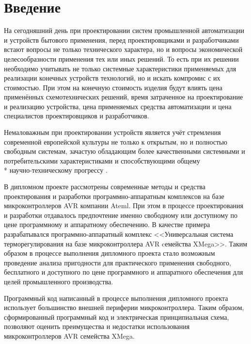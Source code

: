 \section*{Введение}
\begin{par}
На сегодняшний день при проектировании систем промышленной автоматизации и устройств
бытового применения, перед проектировщиками и разработчиками встают вопросы не только технического
характера, но и вопросы экономической целесообразности применения тех или иных решений.
То есть при их решении необходимо учитывать не только системные характеристики применяемых для
реализации конечных устройств технологий, но и искать компромис с их стоимостью. При этом
на конечную стоимость изделия будут влиять цена применённых схемотехнических решений,
время затраченное на проектирование и реализацию устройства, цена применяемых средства автоматизации
и цена специалистов проектировщиков и разработчиков.
\end{par}

\begin{par}
Немаловажным при проектировании устройств является учёт стремления
современной европейской культуры не только к открытым, но и полностью свободным системам,
зачастую обладающим более качественными системными и
потребительскими характеристиками и способствующими общему\\*
научно-техническому прогрессу \cite{lessing}.
\end{par}


В дипломном проекте рассмотрены современные методы и средства проектирования и разработки
программно-аппаратным комплексов на базе микроконтроллеров AVR компании Ateml. При этом
в процессе проектирования и разработки отдавалось предпочтение именно свободному или
доступному по цене программному и аппаратному обеспечению. В качестве примера разрабатывался
программно-аппаратный комплекс <<Универсальная система терморегулирования на базе
микроконтроллера AVR cемейства XMega>>. Таким образом в процессе выполнения дипломного проекта
стало возможным проведение анализа пригодности для практического применения свободного,
бесплатного и доступного по цене программного и аппаратного обеспечения для целей промышленного
производства.

Программный код написанный в процессе выполнения дипломного проекта использует большинство
внешней периферии микроконтроллера. Таким образом, сформированный программный код и электрическая
принципиальная схема, позволяют оценить преимущества и недостатки использования
микроконтроллеров AVR семейства XMega.

\newpage{}

